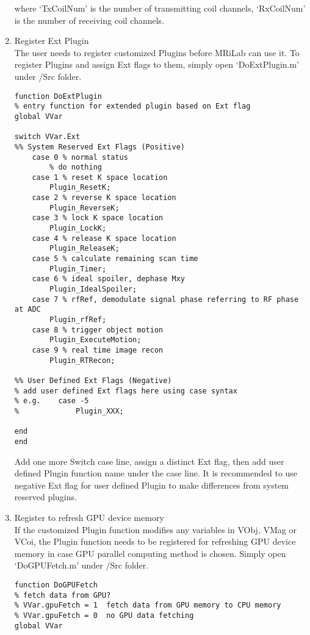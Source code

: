 \documentclass{book}%
\begin{document}
\begin{enumerate}
where `TxCoilNum' is the number of transmitting coil channels, `RxCoilNum' is the number of receiving coil channels.

\item Register Ext Plugin \\

The user needs to register customized Plugins before MRiLab can use it. To register Plugins and assign Ext flags to them, simply open `DoExtPlugin.m' under /Src folder.

\begin{verbatim}
function DoExtPlugin
% entry function for extended plugin based on Ext flag
global VVar

switch VVar.Ext
%% System Reserved Ext Flags (Positive)   
    case 0 % normal status
        % do nothing
    case 1 % reset K space location
        Plugin_ResetK;
    case 2 % reverse K space location
        Plugin_ReverseK;
    case 3 % lock K space location
        Plugin_LockK;
    case 4 % release K space location
        Plugin_ReleaseK;
    case 5 % calculate remaining scan time
        Plugin_Timer;
    case 6 % ideal spoiler, dephase Mxy
        Plugin_IdealSpoiler;
    case 7 % rfRef, demodulate signal phase referring to RF phase at ADC
        Plugin_rfRef;
    case 8 % trigger object motion
        Plugin_ExecuteMotion;
    case 9 % real time image recon
        Plugin_RTRecon;

%% User Defined Ext Flags (Negative)
% add user defined Ext flags here using case syntax
% e.g.    case -5
%             Plugin_XXX;

end
end
\end{verbatim}

Add one more Switch case line, assign a distinct Ext flag, then add user defined Plugin function name under the case line. It is recommended to use negative Ext flag for user defined Plugin to make differences from system reserved plugins.

\item Register to refresh GPU device memory \\

If the customized Plugin function modifies any variables in VObj, VMag or VCoi, the Plugin function needs to be registered for refreshing GPU device memory in case GPU parallel computing method is chosen. Simply open `DoGPUFetch.m' under /Src folder.

\begin{verbatim}
function DoGPUFetch
% fetch data from GPU?
% VVar.gpuFetch = 1  fetch data from GPU memory to CPU memory
% VVar.gpuFetch = 0  no GPU data fetching
global VVar


\end{verbatim}
\end{enumerate}
\end{document}

